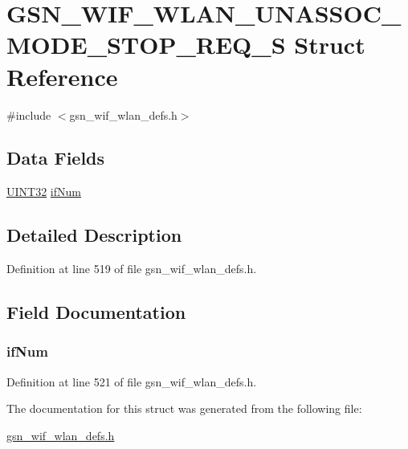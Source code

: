 \hypertarget{a00413}{
\section{GSN\_\-WIF\_\-WLAN\_\-UNASSOC\_\-MODE\_\-STOP\_\-REQ\_\-S Struct Reference}
\label{a00413}
}


{\ttfamily \#include $<$gsn\_\-wif\_\-wlan\_\-defs.h$>$}

\subsection*{Data Fields}
\begin{DoxyCompactItemize}
\item 
\hyperlink{a00660_gae1e6edbbc26d6fbc71a90190d0266018}{UINT32} \hyperlink{a00413_ab582fd779b13f74e06e2491389a60aa0}{ifNum}
\end{DoxyCompactItemize}


\subsection{Detailed Description}


Definition at line 519 of file gsn\_\-wif\_\-wlan\_\-defs.h.



\subsection{Field Documentation}
\hypertarget{a00413_ab582fd779b13f74e06e2491389a60aa0}{
\subsubsection[{ifNum}]{ {\bf ifNum}}}
\label{a00413_ab582fd779b13f74e06e2491389a60aa0}


Definition at line 521 of file gsn\_\-wif\_\-wlan\_\-defs.h.



The documentation for this struct was generated from the following file:\begin{DoxyCompactItemize}
\item 
\hyperlink{a00613}{gsn\_\-wif\_\-wlan\_\-defs.h}\end{DoxyCompactItemize}
